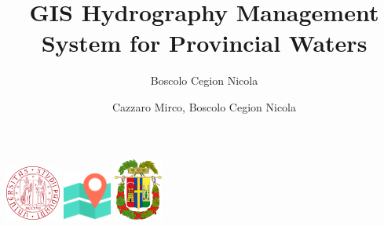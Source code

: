 \documentclass[a4paper, 11pt]{article}
\title{GIS Hydrography Management System for Provincial Waters}
\author{Boscolo Cegion Nicola}
\author{Cazzaro Mirco, Boscolo Cegion Nicola}
\begin{document}
\maketitle
\begin{center}
    \includegraphics[width = 18mm]{img/unipd.png}
    \hspace{10mm}
    \includegraphics[width = 16mm]{img/map.png}
    \hspace{10mm}
    \includegraphics[width = 16mm]{img/belluno.png}
\end{center}
\tableofcontents






\end{document}
